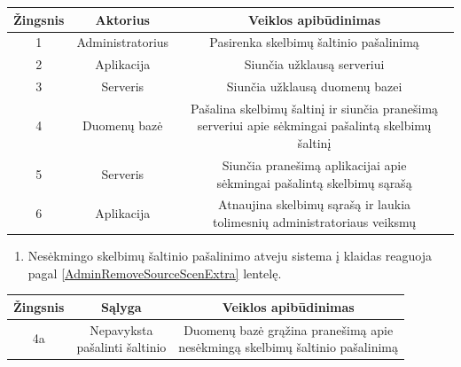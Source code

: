 \documentclass[12pt]{article}
\begin{document}
		\begin{center}
		\begin{tabular}{ | c | c | c | }
			\hline
			Žingsnis & Aktorius         & Veiklos apibūdinimas \\ \hline
			1        & Administratorius & Pasirenka skelbimų šaltinio pašalinimą \\ \hline
			2        & Aplikacija       & Siunčia užklausą serveriui \\ \hline
			3        & Serveris         & Siunčia užklausą duomenų bazei \\ \hline
			4        & Duomenų bazė     & \makecell{Pašalina skelbimų šaltinį ir siunčia pranešimą \\ serveriui apie sėkmingai pašalintą skelbimų šaltinį} \\ \hline
			5        & Serveris         & \makecell{Siunčia pranešimą aplikacijai apie \\ sėkmingai pašalintą skelbimų sąrašą} \\ \hline
			6        & Aplikacija       & \makecell{Atnaujina skelbimų sąrašą ir laukia \\ tolimesnių administratoriaus veiksmų} \\ \hline
		\end{tabular}
		\end{center}
		\bigskip

	\begin{enumerate}[resume,labelindent=10pt,leftmargin=2.2cm]
		\item Nesėkmingo skelbimų šaltinio pašalinimo atveju sistema į klaidas reaguoja pagal \ref{AdminRemoveSourceScenExtra} lentelę.
	\end{enumerate}

		\begin{center}
		\begin{tabular}{ | c | c | c | }
			\hline
			Žingsnis & Sąlyga         & Veiklos apibūdinimas \\ \hline
			4a       & \makecell{Nepavyksta \\ pašalinti šaltinio} & \makecell{Duomenų bazė grąžina pranešimą apie \\ nesėkmingą skelbimų šaltinio pašalinimą} \\ \hline
		\end{tabular}
		\end{center}
		\bigskip
		
\end{document}
